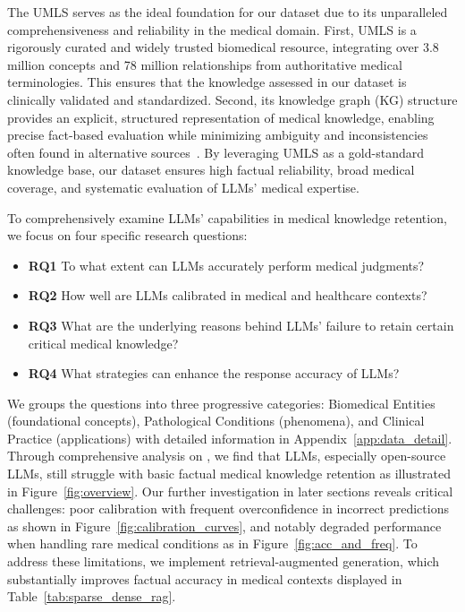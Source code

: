 The UMLS serves as the ideal foundation for our dataset due to its unparalleled comprehensiveness and reliability in the medical domain. 
First, UMLS is a rigorously curated and widely trusted biomedical resource, integrating over 3.8 million concepts and 78 million relationships from authoritative medical terminologies. This ensures that the knowledge assessed in our dataset is clinically validated and standardized. 
Second, its knowledge graph (KG) structure provides an explicit, structured representation of medical knowledge, enabling precise fact-based evaluation while minimizing ambiguity and inconsistencies often found in alternative sources~\citep{abacha2017overview, malaviya-etal-2024-expertqa}. 
By leveraging UMLS as a gold-standard knowledge base, our dataset ensures high factual reliability, broad medical coverage, and systematic evaluation of LLMs’ medical expertise.

To comprehensively examine LLMs’ capabilities in medical knowledge retention, we focus on four specific research questions:

\begin{itemize}[left=0pt, topsep=0pt, itemsep=0pt, partopsep=0pt,parsep=0pt]
    \item \textbf{RQ1} To what extent can LLMs accurately perform medical judgments?
    \item \textbf{RQ2} How well are LLMs calibrated in medical and healthcare contexts?
    \item \textbf{RQ3} What are the underlying reasons behind LLMs’ failure to retain certain critical medical knowledge?
    \item \textbf{RQ4} What strategies can enhance the response accuracy of LLMs?
\end{itemize}

We groups the questions into three progressive categories: Biomedical Entities (foundational concepts), Pathological Conditions (phenomena), and Clinical Practice (applications) with detailed information in Appendix~\ref{app:data_detail}. Through comprehensive analysis on \mkj, we find that LLMs, especially open-source LLMs, still struggle with basic factual medical knowledge retention as illustrated in Figure~\ref{fig:overview}. 
Our further investigation in later sections reveals critical challenges: poor calibration with frequent overconfidence in incorrect predictions as shown in Figure~\ref{fig:calibration_curves}, and notably degraded performance when handling rare medical conditions as in Figure~\ref{fig:acc_and_freq}. To address these limitations, we implement retrieval-augmented generation, which substantially improves factual accuracy in medical contexts displayed in Table~\ref{tab:sparse_dense_rag}.



